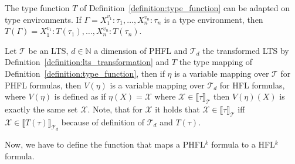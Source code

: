 The type function $T$ of Definition~\ref{definition:type_function} can be adapted on type environments. If
$\Gamma = X_1^{v_1} \colon \tau_1, \dots, X_n^{v_n} \colon \tau_n$ is a type environment, then $T(\Gamma) =
X_1^{v_1} \colon T(\tau_1), \dots, X_n^{v_n} \colon T(\tau_n)$.

\begin{definition}
    \label{definition:variable_mapping_function}
    Let $\mathcal{T}$ be an LTS, $d \in \mathbb{N}$ a dimension of PHFL and $\mathcal{T}_d$ the transformed LTS by
    Definition~\ref{definition:lts_transformation} and $T$ the type mapping of
    Definition~\ref{definition:type_function}, then if $\eta$ is a variable mapping over $\mathcal{T}$ for PHFL
    formulas, then $V(\eta)$ is a variable mapping over $\mathcal{T}_d$ for HFL formulas, where $V(\eta)$ is defined
    as if $\eta(X) = \mathcal{X}$ where $\mathcal{X} \in \llbracket \tau \rrbracket_\mathcal{T}$ then $V(\eta)(X)$ is
    exactly the same set $\mathcal{X}$. Note, that for $\mathcal{X}$ it holds that $\mathcal{X} \in \llbracket \tau
    \rrbracket_\mathcal{T}$ iff $\mathcal{X} \in \llbracket T(\tau)\rrbracket_{\mathcal{T}_d}$ because of definition
    of $\mathcal{T}_d$ and $T(\tau)$.
\end{definition}

Now, we have to define the function that maps a PHFL$^k$ formula to a HFL$^k$ formula.

